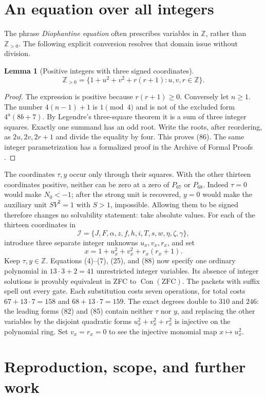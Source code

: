 \documentclass[11pt,a4paper]{article}
\newtheorem{lemma}[theorem]{Lemma}
\theoremstyle{definition}
\theoremstyle{remark}
\newcommand{\Z}{\mathbb Z}
\newcommand{\Pos}{\mathbb Z_{>0}}
\newcommand{\Con}{\operatorname{Con}}
\newcommand{\src}[1]{\texttt{\detokenize{#1}}}
\newcommand{\Pbase}{P_{67}}
\newcommand{\Plow}{P_{68}}
\begin{document}
\section{An equation over all integers}\label{sec:integers}
The phrase \emph{Diophantine equation} often prescribes variables in
\(\Z\), rather than \(\Pos\). The following explicit conversion
resolves that domain issue without division.
\begin{lemma}[Positive integers with three signed coordinates]
\[
 \Pos=\{1+u^2+v^2+r(r+1):u,v,r\in\Z\}. \tag{86}
\]
\end{lemma}
\begin{proof}
The expression is positive because \(r(r+1)\ge0\).
Conversely let \(n\ge1\). The number \(4(n-1)+1\) is
\(1\pmod4\) and is not of the excluded form
\(4^a(8b+7)\). By Legendre's three-square theorem it is a sum of
three integer squares. Exactly one summand has an odd root.
Write the roots, after reordering, as \(2u,2v,2r+1\)
and divide the equality by four. This proves (86).
The same integer parametrization has a formalized proof in
the Archive of Formal Proofs \cite{threesquares}.
\end{proof}
The coordinates \(\tau,y\) occur only through their squares.
With the other thirteen coordinates positive, neither can be
zero at a zero of \(\Pbase\) or \(\Plow\).
Indeed \(\tau=0\) would make \(N_0<-1\);
after the strong unit is recovered, \(y=0\) would make the
auxiliary unit \(SV^2=1\) with \(S>1\), impossible.
Allowing them to be signed therefore changes no solvability
statement: take absolute values.
For each of the thirteen coordinates in
\[
 \mathcal I=\{J,F,\alpha,z,f,h,i,T,s,w,\eta,\zeta,\gamma\}, \tag{87}
\]
introduce three separate integer unknowns \(u_x,v_x,r_x\), and set
\[
 x=1+u_x^2+v_x^2+r_x(r_x+1). \tag{88}
\]
Keep \(\tau,y\in\Z\). Equations (4)--(7), (25), and (88)
now specify one ordinary polynomial in \(13\cdot3+2=41\)
unrestricted integer variables. Its absence of integer solutions
is provably equivalent in ZFC to \(\Con(\mathrm{ZFC})\).
The packets with suffix \src{over_Z41} spell out every gate.
Each substitution costs seven operations, for total costs
\(67+13\cdot7=158\) and \(68+13\cdot7=159\).
The exact degrees double to \(310\) and \(246\):
the leading forms (82) and (85) contain neither \(\tau\) nor
\(y\), and replacing the other variables by the disjoint
quadratic forms \(u_x^2+v_x^2+r_x^2\) is injective on the
polynomial ring. Set \(v_x=r_x=0\) to see the injective
monomial map \(x\mapsto u_x^2\).

\section{Reproduction, scope, and further work}\label{sec:reproduce}
\end{document}
